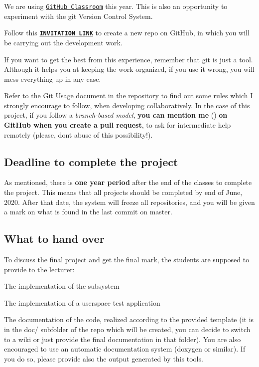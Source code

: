 We are using \href{https://classroom.github.com/}{\tt Git\+Hub Classroom} this year. This is also an opportunity to experiment with the git Version Control System.

Follow this {\bfseries \href{https://classroom.github.com/a/j0yfI-y4}{\tt I\+N\+V\+I\+T\+A\+T\+I\+ON L\+I\+NK}} to create a new repo on Git\+Hub, in which you will be carrying out the development work.

If you want to get the best from this experience, remember that git is just a tool. Although it helps you at keeping the work organized, if you use it wrong, you will mess everything up in any case.

Refer to the Git Usage document in the repository to find out some rules which I strongly encourage to follow, when developing collaboratively. In the case of this project, if you follow a {\itshape branch-\/based model}, {\bfseries you can mention me} () {\bfseries on Git\+Hub when you create a pull request}, to ask for intermediate help remotely (please, don\textquotesingle{}t abuse of this possibility!).

\subsection*{Deadline to complete the project}

As mentioned, there is {\bfseries one year period} after the end of the classes to complete the project. This means that all projects should be completed by end of June, 2020. After that date, the system will freeze all repositories, and you will be given a mark on what is found in the last commit on {\ttfamily master}.

\subsection*{What to hand over}

To discuss the final project and get the final mark, the students are supposed to provide to the lecturer\+:


\begin{DoxyItemize}
\item The implementation of the subsystem
\item The implementation of a userspace test application
\item The documentation of the code, realized according to the provided template (it is in the {\ttfamily doc/} subfolder of the repo which will be created, you can decide to switch to a wiki or just provide the final documentation in that folder). You are also encouraged to use an automatic documentation system (doxygen or similar). If you do so, please provide also the output generated by this tools.
\end{DoxyItemize}

